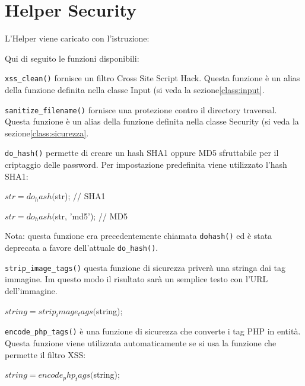 \section{Helper Security}
\label{helper:security}
L'Helper viene caricato con l'istruzione:


Qui di seguito le funzioni disponibili:

\verb|xss_clean()| fornisce un filtro Cross Site Script Hack. Questa funzione è un alias della funzione definita nella classe Input (si veda la sezione\vref{class:input}.

\verb|sanitize_filename()| fornisce una protezione contro il directory traversal. Questa funzione è un alias della funzione definita nella classe Security (si veda la sezione\vref{class:sicurezza}. 

\verb|do_hash()| permette di creare un hash SHA1 oppure MD5 sfruttabile per il criptaggio delle password. Per impostazione predefinita viene utilizzato l'hash SHA1:

\begin{code}
$str = do_hash($str); // SHA1

$str = do_hash($str, 'md5'); // MD5
\end{code}

Nota: questa funzione era precedentemente chiamata \verb|dohash()| ed è stata deprecata a favore dell'attuale \verb|do_hash()|.

\verb|strip_image_tags()| questa funzione di sicurezza priverà una stringa dai tag immagine. Im questo modo il risultato sarà un semplice testo con l'URL dell'immagine.

\begin{code}
$string = strip_image_tags($string);
\end{code}

\verb|encode_php_tags()| è una funzione di sicurezza che converte i tag PHP in entità. Questa funzione viene utilizzata automaticamente se si usa la funzione che permette il filtro XSS:

\begin{code}
$string = encode_php_tags($string);
\end{code}